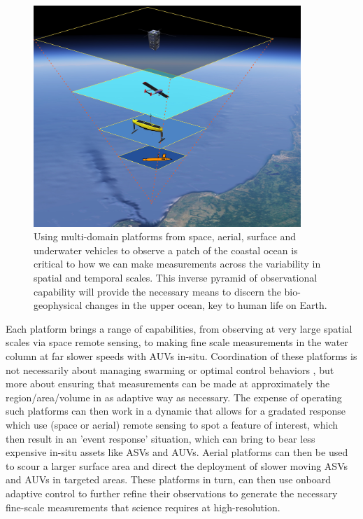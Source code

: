 \begin{figure}[!h]
  \centering
  \includegraphics[width=0.9\textwidth]{fig/inverse-pyramid.jpg}
  \caption{Using multi-domain platforms from space, aerial, surface
    and underwater vehicles to observe a patch of the coastal ocean is
    critical to how we can make measurements across the variability in
    spatial and temporal scales. This \textsf{inverse pyramid of
      observational} capability will provide the necessary means to
    discern the bio-geophysical changes in the upper ocean, key to
    human life on Earth.}
  \label{fig:inverse}
\end{figure}

Each platform brings a range of capabilities, from observing at very
large spatial scales via space remote sensing, to making fine scale
measurements in the water column at far slower speeds with AUVs
in-situ. Coordination of these platforms is not necessarily about
managing swarming \cite{osterloh12,lodovisi18,zereik18} or optimal
control behaviors \cite{eichhorn15}, but more about ensuring that
measurements can be made at approximately the region/area/volume in as
adaptive way as necessary. The expense of operating such platforms can
then work in a dynamic that allows for a gradated response which use
(space or aerial) remote sensing to spot a feature of interest, which
then result in an 'event response' situation, which can bring to bear
less expensive in-situ assets like ASVs and AUVs. Aerial platforms can
then be used to scour a larger surface area and direct the deployment
of slower moving ASVs and AUVs in targeted areas. These platforms in
turn, can then use onboard adaptive control to further refine their
observations to generate the necessary fine-scale measurements that
science requires at high-resolution.

